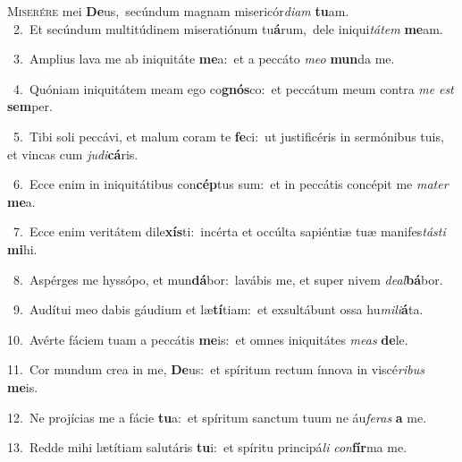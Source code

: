 \lettrine{\initial\textcolor{\initialcolor}{M}}{iserére} mei \textbf{De}\-us,~\star secúndum magnam misericór\-\textit{di}\-\textit{am} \textbf{tu}\-am.\\
{\numbfont\textcolor{\numbcolor}{~2.}}~Et secúndum multitúdinem miseratiónum tu\-\textbf{á}\-rum,~\star dele iniqui\-\textit{tá}\-\textit{tem} \textbf{me}\-am.\par
{\numbfont\textcolor{\numbcolor}{~3.}}~Amplius lava me ab iniquitáte \textbf{me}\-a:~\star et a peccáto \textit{me}\-\textit{o} \textbf{mun}\-da me.\par
{\numbfont\textcolor{\numbcolor}{~4.}}~Quóniam iniquitátem meam ego co\-\textbf{gnós}\-co:~\star et peccátum meum contra \textit{me} \textit{est} \textbf{sem}\-per.\par
{\numbfont\textcolor{\numbcolor}{~5.}}~Tibi soli peccávi, et malum coram te \textbf{fe}\-ci:~\star ut justificéris in sermónibus tuis, et vincas cum \textit{ju}\-\textit{di}\textbf{cá}ris.\par
{\numbfont\textcolor{\numbcolor}{~6.}}~Ecce enim in iniquitátibus con\-\textbf{cép}\-tus sum:~\star et in peccátis concépit me \textit{ma}\-\textit{ter} \textbf{me}\-a.\par
{\numbfont\textcolor{\numbcolor}{~7.}}~Ecce enim veritátem dile\-\textbf{xís}\-ti:~\star incérta et occúlta sapiéntiæ tuæ manifes\-\textit{tás}\-\textit{ti} \textbf{mi}\-hi.\par
{\numbfont\textcolor{\numbcolor}{~8.}}~Aspérges me hyssópo, et mun\-\textbf{dá}\-bor:~\star lavábis me, et super nivem \textit{de}\-\textit{al}\textbf{bá}bor.\par
{\numbfont\textcolor{\numbcolor}{~9.}}~Audítui meo dabis gáudium et læ\-\textbf{tí}\-tiam:~\star et exsultábunt ossa hu\-\textit{mi}\-\textit{li}\textbf{á}ta.\par
{\numbfont\textcolor{\numbcolor}{10.}}~Avérte fáciem tuam a peccátis \textbf{me}\-is:~\star et omnes iniquitátes \textit{me}\-\textit{as} \textbf{de}\-le.\par
{\numbfont\textcolor{\numbcolor}{11.}}~Cor mundum crea in me, \textbf{De}\-us:~\star et spíritum rectum ínnova in viscé\-\textit{ri}\-\textit{bus} \textbf{me}\-is.\par
{\numbfont\textcolor{\numbcolor}{12.}}~Ne projícias me a fácie \textbf{tu}\-a:~\star et spíritum sanctum tuum ne áu\-\textit{fe}\-\textit{ras} \textbf{a} me.\par
{\numbfont\textcolor{\numbcolor}{13.}}~Redde mihi lætítiam salutáris \textbf{tu}\-i:~\star et spíritu principá\textit{li} \textit{con}\-\textbf{fír}ma me.\par
